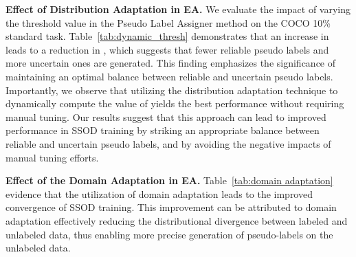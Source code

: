 \documentclass[10pt,twocolumn,letterpaper]{article}
\begin{document}
\textbf{Effect of Distribution Adaptation in EA.} We evaluate the impact of varying the threshold value  in the Pseudo Label Assigner method on the COCO 10\% standard task. Table~\ref{tab:dynamic_thresh} demonstrates that an increase in  leads to a reduction in , which suggests that fewer reliable pseudo labels and more uncertain ones are generated. This finding emphasizes the significance of maintaining an optimal balance between reliable and uncertain pseudo labels. Importantly, we observe that utilizing the distribution adaptation technique to dynamically compute the value of  yields the best performance without requiring manual tuning. Our results suggest that this approach can lead to improved performance in SSOD training by striking an appropriate balance between reliable and uncertain pseudo labels, and by avoiding the negative impacts of manual tuning efforts.
\begin{table}[h]
  \centering 
  \caption{Ablation studies on threshold value  , EA indicates  is calculated by Epoch Adaptor.}
  \label{tab:dynamic_thresh}
\end{table}

\textbf{Effect of the Domain Adaptation in EA.} Table~\ref{tab:domain adaptation} evidence that the utilization of domain adaptation leads to the improved convergence of SSOD training. This improvement can be attributed to domain adaptation effectively reducing the distributional divergence between labeled and unlabeled data, thus enabling more precise generation of pseudo-labels on the unlabeled data.
\begin{table}[h]
  \centering 
{}
  \caption{Ablation studies on domain adaptation in EA.}
  \label{tab:domain adaptation}
\end{table}
\end{document}

